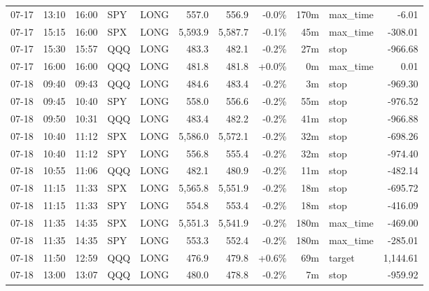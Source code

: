 \documentclass[11pt,a4paper,twoside]{article}
\begin{document}
\begin{center}
\begin{longtable}{>{\color{txtmain}}l l l l l r r r r >{\color{txtmain}}l r}
07-17 & 13:10 & 16:00 & SPY & LONG & 557.0 & 556.9 & \textcolor{lossred}{-0.0\%} & 170m & max\_time & \textcolor{lossred}{-6.01} \\
07-17 & 15:15 & 16:00 & SPX & LONG & 5,593.9 & 5,587.7 & \textcolor{lossred}{-0.1\%} & 45m & max\_time & \textcolor{lossred}{-308.01} \\
07-17 & 15:30 & 15:57 & QQQ & LONG & 483.3 & 482.1 & \textcolor{lossred}{-0.2\%} & 27m & stop & \textcolor{lossred}{-966.68} \\
07-17 & 16:00 & 16:00 & QQQ & LONG & 481.8 & 481.8 & \textcolor{wingreen}{+0.0\%} & 0m & max\_time & \textcolor{wingreen}{0.01} \\
07-18 & 09:40 & 09:43 & QQQ & LONG & 484.6 & 483.4 & \textcolor{lossred}{-0.2\%} & 3m & stop & \textcolor{lossred}{-969.30} \\
07-18 & 09:45 & 10:40 & SPY & LONG & 558.0 & 556.6 & \textcolor{lossred}{-0.2\%} & 55m & stop & \textcolor{lossred}{-976.52} \\
07-18 & 09:50 & 10:31 & QQQ & LONG & 483.4 & 482.2 & \textcolor{lossred}{-0.2\%} & 41m & stop & \textcolor{lossred}{-966.88} \\
07-18 & 10:40 & 11:12 & SPX & LONG & 5,586.0 & 5,572.1 & \textcolor{lossred}{-0.2\%} & 32m & stop & \textcolor{lossred}{-698.26} \\
07-18 & 10:40 & 11:12 & SPY & LONG & 556.8 & 555.4 & \textcolor{lossred}{-0.2\%} & 32m & stop & \textcolor{lossred}{-974.40} \\
07-18 & 10:55 & 11:06 & QQQ & LONG & 482.1 & 480.9 & \textcolor{lossred}{-0.2\%} & 11m & stop & \textcolor{lossred}{-482.14} \\
07-18 & 11:15 & 11:33 & SPX & LONG & 5,565.8 & 5,551.9 & \textcolor{lossred}{-0.2\%} & 18m & stop & \textcolor{lossred}{-695.72} \\
07-18 & 11:15 & 11:33 & SPY & LONG & 554.8 & 553.4 & \textcolor{lossred}{-0.2\%} & 18m & stop & \textcolor{lossred}{-416.09} \\
07-18 & 11:35 & 14:35 & SPX & LONG & 5,551.3 & 5,541.9 & \textcolor{lossred}{-0.2\%} & 180m & max\_time & \textcolor{lossred}{-469.00} \\
07-18 & 11:35 & 14:35 & SPY & LONG & 553.3 & 552.4 & \textcolor{lossred}{-0.2\%} & 180m & max\_time & \textcolor{lossred}{-285.01} \\
07-18 & 11:50 & 12:59 & QQQ & LONG & 476.9 & 479.8 & \textcolor{wingreen}{+0.6\%} & 69m & target & \textcolor{wingreen}{1,144.61} \\
07-18 & 13:00 & 13:07 & QQQ & LONG & 480.0 & 478.8 & \textcolor{lossred}{-0.2\%} & 7m & stop & \textcolor{lossred}{-959.92} \\

\end{longtable}
\end{center}
\end{document}
